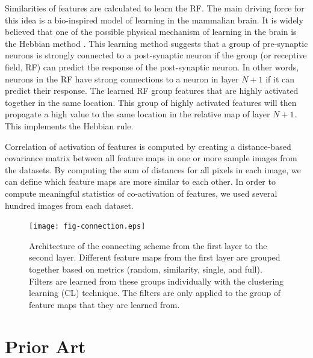 \documentclass{article} %
\begin{document}
Similarities of features are calculated to learn the RF. 
The main driving force for this idea is a bio-inspired model of learning in the mammalian brain.
It is widely believed that one of the possible physical mechanism of learning in the brain is the Hebbian method \cite{masquelier2007learning}.
This learning method suggests that a group of pre-synaptic neurons is strongly connected to a post-synaptic neuron if the group
(or receptive field, RF) can predict the response of the post-synaptic neuron.
In other words, neurons in the RF have strong connections to a neuron in layer $N+1$ if it can predict their response.
The learned RF group features that are highly activated together in the same location.
This group of highly activated features will then propagate a high value to the same location in the relative map of layer $N+1$.
This implements the Hebbian rule.

Correlation of activation of features is computed by creating a distance-based covariance matrix between all feature maps in one or more sample images from the datasets. By computing the sum of distances for all pixels in each image, we can define which feature maps are more similar to each other. In order to compute meaningful statistics of co-activation of features, we used several hundred images from each dataset.


\begin{figure}
\texttt{[image: fig-connection.eps]}
\caption{Architecture of the connecting scheme from the first layer to the second layer. 
Different feature maps from the first layer are grouped together based on metrics (random, similarity, single, and full). 
Filters are learned from these groups individually with the clustering learning (CL) technique.
The filters are only applied to the group of feature maps that they are learned from.}
\label{fig-learnlayers}
\end{figure}


\section{Prior Art}
\label{sec-priorart}
\end{document}
